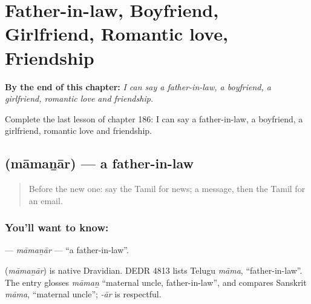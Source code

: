 
\chapter{Father-in-law, Boyfriend, Girlfriend, Romantic love, Friendship}
\label{ch:ta-father-in-law-boyfriend-girlfriend-romantic-love-friendship}

\begin{chapteropening}
\textbf{By the end of this chapter:} \emph{I can say a father-in-law, a boyfriend, a girlfriend, romantic love and friendship.}

Complete the last lesson of chapter 186: I can say a father-in-law, a boyfriend, a girlfriend, romantic love and friendship.
\end{chapteropening}

\section[\texorpdfstring{\ta{மாமனார்} (māmaṉār)}{மாமனார் (māmaṉār)}]{ (māmaṉār) — a father-in-law}

\label{lesson:TA-C186-mamanar}



\begin{quote}
Before the new one: say the Tamil for news; a message, then the Tamil for an email.
\end{quote}

\subsection*{You'll want to know: }
\textbf{} — \emph{māmaṉār} — \textquotedblleft{}a father-in-law\textquotedblright{}.

\begin{cousinweb}
\textbf{} (\emph{māmaṉār}) is native Dravidian. DEDR 4813 lists Telugu \emph{māma}, \textquotedblleft{}father-in-law\textquotedblright{}. The entry glosses \emph{māmaṉ} \textquotedblleft{}maternal uncle, father-in-law\textquotedblright{}, and compares Sanskrit \emph{māma}, \textquotedblleft{}maternal uncle\textquotedblright{}; \emph{-ār} is respectful.
\end{cousinweb}

